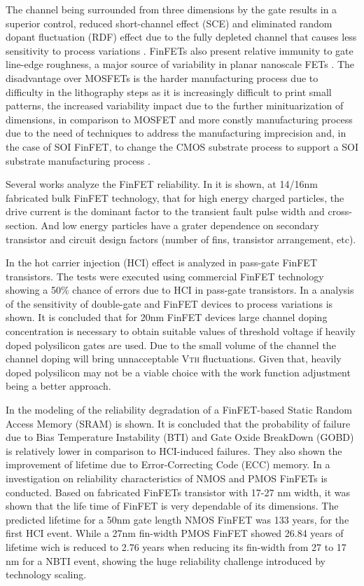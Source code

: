 \documentclass[ecp,tc, english]{iiufrgs}
\begin{document}
The channel being surrounded from three dimensions by the gate results in a superior control, reduced short-channel effect (SCE) and eliminated random dopant fluctuation (RDF) effect due to the fully depleted channel that causes less sensitivity to process variations \cite{taur2013fundamentals}. FinFETs also present relative immunity to gate line-edge roughness, a major source of variability in planar nanoscale FETs \cite{finfetchar1}. The disadvantage over MOSFETs is the harder manufacturing process due to difficulty in the lithography steps as it is increasingly difficult to print small patterns, the increased variability impact due to the further minituarization of dimensions, in comparison to MOSFET and more constly manufacturing process due to the need of techniques to address the manufacturing imprecision and, in the case of SOI FinFET, to change the CMOS substrate process to support a SOI substrate manufacturing process \cite{finfetchar1} \cite{finfetdis}.

Several works analyze the FinFET reliability. In \cite{FinFET01} it is shown, at 14/16nm fabricated bulk FinFET technology, that for high energy charged particles, the drive current is the dominant factor to the transient fault pulse width and cross-section. And low energy particles have a grater dependence on secondary transistor and circuit design factors (number of fins, transistor arrangement, etc). 

In \cite{FinFET02} the hot carrier injection (HCI) effect is analyzed in pass-gate FinFET transistors. The tests were executed using commercial FinFET technology showing a 50\% chance of errors due to HCI in pass-gate transistors. In \cite{FinFET03} a analysis of the sensitivity of double-gate and FinFET devices to process variations is shown. It is concluded that for 20nm FinFET devices large channel doping concentration is necessary to obtain suitable values of threshold voltage if heavily doped polysilicon gates are used. Due to the small volume of the channel the channel doping will bring unnacceptable V\textsc{th} fluctuations. Given that, heavily doped polysilicon may not be a viable choice with the work function adjustment being a better approach. 

In \cite{FinFET04} the modeling of the reliability degradation of a FinFET-based Static Random Access Memory (SRAM) is shown. It is concluded that the probability of failure due to Bias Temperature Instability (BTI) and Gate Oxide BreakDown (GOBD) is relatively lower in comparison to HCI-induced failures. They also shown the improvement of lifetime due to Error-Correcting Code (ECC) memory. In \cite{FINFET05} a investigation on reliability characteristics of NMOS and PMOS FinFETs is conducted. Based on fabricated FinFETs transistor with 17-27 nm width, it was shown that the life time of FinFET is very dependable of its dimensions. The predicted lifetime for a 50nm gate length NMOS FinFET was 133 years, for the first HCI event. While a 27nm fin-width PMOS FinFET showed 26.84 years of lifetime wich is reduced to 2.76 years when reducing its fin-width from 27 to 17 nm for a NBTI event, showing the huge reliability challenge introduced by technology scaling.
\end{document}

